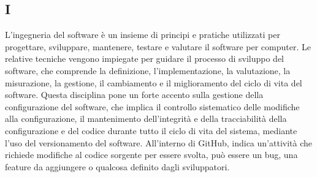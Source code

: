 \begin{center}
\section*{I}
\end{center}
L'ingegneria del software è un insieme di principi e pratiche utilizzati per progettare, sviluppare, mantenere, testare e valutare il software per computer. Le relative tecniche vengono impiegate per guidare il processo di sviluppo del software, che comprende la definizione, l'implementazione, la valutazione, la misurazione, la gestione, il cambiamento e il miglioramento del ciclo di vita del software. Questa disciplina pone un forte accento sulla gestione della configurazione del software, che implica il controllo sistematico delle modifiche alla configurazione, il mantenimento dell'integrità e della tracciabilità della configurazione e del codice durante tutto il ciclo di vita del sistema, mediante l'uso del versionamento del software.
All'interno di GitHub, indica un'attività che richiede modifiche al codice sorgente per essere svolta, può essere un bug, una feature da aggiungere o qualcosa definito dagli sviluppatori.
